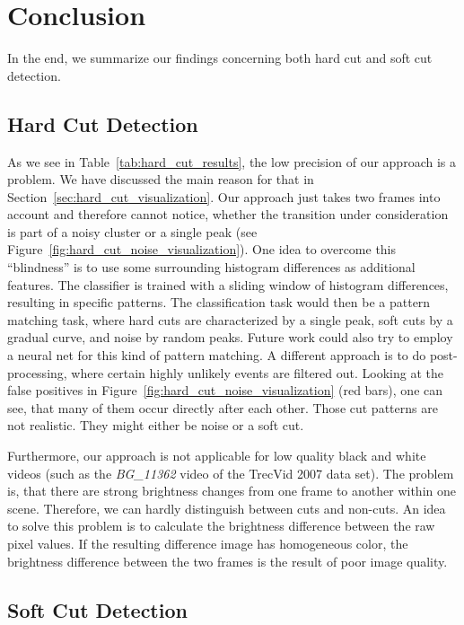 \section{Conclusion}
\label{sec:conclusion}
In the end, we summarize our findings concerning both hard cut and soft cut detection.

\subsection{Hard Cut Detection}
\label{sec:conclusion_hard_cut}

As we see in Table~\ref{tab:hard_cut_results}, the low precision of our approach is a problem.
We have discussed the main reason for that in Section~\ref{sec:hard_cut_visualization}.
Our approach just takes two frames into account and therefore cannot notice, whether the transition under consideration is part of a noisy cluster or a single peak (see Figure~\ref{fig:hard_cut_noise_visualization}).
One idea to overcome this ``blindness'' is to use some surrounding histogram differences as additional features.
The classifier is trained with a sliding window of histogram differences, resulting in specific patterns.
The classification task would then be a pattern matching task, where hard cuts are characterized by a single peak, soft cuts by a gradual curve, and noise by random peaks.
Future work could also try to employ a neural net for this kind of pattern matching.
A different approach is to do post-processing, where certain highly unlikely events are filtered out.
Looking at the false positives in Figure~\ref{fig:hard_cut_noise_visualization} (red bars), one can see, that many of them occur directly after each other.
Those cut patterns are not realistic.
They might either be noise or a soft cut.

Furthermore, our approach is not applicable for low quality black and white videos (such as the \emph{BG\_11362} video of the TrecVid 2007 data set).
The problem is, that there are strong brightness changes from one frame to another within one scene.
Therefore, we can hardly distinguish between cuts and non-cuts.
An idea to solve this problem is to calculate the brightness difference between the raw pixel values.
If the resulting difference image has homogeneous color, the brightness difference between the two frames is the result of poor image quality.

\subsection{Soft Cut Detection}
\label{sec:conclusion_hard_cut}

